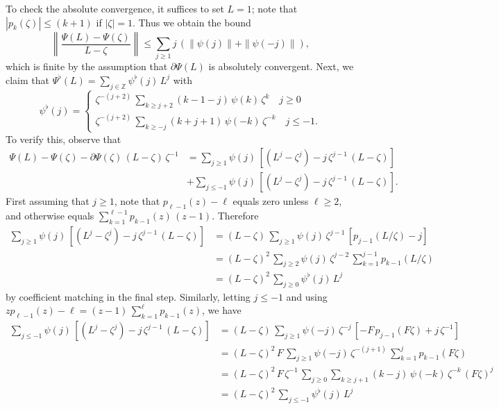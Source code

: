 \documentclass[a4paper]{book}
\def\ZZ{\mathbb Z}
\begin{document}
 To check the absolute convergence, it suffices to set $L = 1$;  
 note that $| p_k  (\zeta) | \leq (k+1)$
 if $|\zeta| = 1$.  Thus  we obtain the bound
\[
 \left\|   \frac{ \Psi (L) - \Psi (\zeta) }{ L - \zeta}  \right\| 
 \leq \sum_{j \geq 1}  j \, \left( \| \psi (j) \|  +\| \psi (-j) \| \right),
\]
 which is finite by the assumption that $\partial \Psi (L)$ 
 is absolutely convergent.   Next, we claim that
$\Psi^{\flat} (L) = \sum_{j \in \ZZ} \psi^{\flat} (j) \, L^j$ with
\[
 \psi^{\flat} (j) = \begin{cases}  {\zeta}^{-(j+2)} \, 
 \sum_{k \geq j+2} (k-1-j) \, \psi (k) \, \zeta^k  \quad j \geq 0 \\
					\zeta^{-(j+2)} \, \sum_{k \geq -j} (k+j+1) \,
					\psi (-k) \,  {\zeta}^{-k} \quad j \leq -1.	
		\end{cases}
\]
To verify this, observe that
\begin{align*}
  \Psi (L) - \Psi (\zeta)  - \partial \Psi (\zeta) \, (L- \zeta) \, \zeta^{-1} 
 & = \sum_{j \geq 1} \psi (j) \, \left[ (L^j - \zeta^j)  
 - j \, \zeta^{j-1}   \, (L- \zeta) \right]  \\
& + \sum_{j \leq -1} \psi (j) \, \left[ (L^j - \zeta^j)  
- j \, \zeta^{j-1}   \, (L- \zeta) \right].
\end{align*}
 First assuming that $j \geq 1$, note that $p_{\ell-1} (z) - \ell$
 equals zero unless $\ell \geq 2$, 
 and otherwise   equals $\sum_{k=1}^{\ell-1} p_{k-1} (z) \, (z -1)$. Therefore 
\begin{align*}
 \sum_{j \geq 1} \psi (j) \, \left[ (L^j - \zeta^j)  
 - j \, \zeta^{j-1}  \, (L- \zeta) \right]    & 
 = (L- \zeta) \, \sum_{j \geq 1} \psi (j) \, 
 \zeta^{j-1} \, \left[   p_{j-1} (L/\zeta) 	  - j   \right]   \\
 & =  {(L - \zeta)}^2 \, \sum_{j \geq 2} \psi (j) \, 
 \zeta^{j-2} \, \sum_{k=1}^{j-1} p_{k-1} (L/\zeta)   \\
 & =  {(L - \zeta)}^2 \, \sum_{j \geq 0} \psi^{\flat} (j) \,  L^j 
\end{align*}
 by coefficient matching in the final step.  Similarly, letting $j \leq -1$ 
 and using $z p_{\ell-1} (z) - \ell = (z-1) \, 
 \sum_{k=1}^{\ell} p_{k-1} (z)$, we have
\begin{align*}
 \sum_{j \leq -1} \psi (j) \, \left[ (L^j - \zeta^j) 
 - j \, \zeta^{j-1}  \, (L- \zeta) \right]    & 
  =  (L- \zeta) \, \sum_{j \geq 1} \psi (-j) \, \zeta^{-j} \,
  \left[ - F \,  p_{j-1} (F \zeta)  +  j  \, \zeta^{-1} \right]   \\
 & =  {(L- \zeta)}^2 \, F \, \sum_{j \geq 1} \psi(-j) \, 
 \zeta^{-(j+1)} \, \sum_{k=1}^{j} p_{k-1} (F \zeta)  \\
 & = {(L- \zeta)}^2 \, F \, \zeta^{-1} \, \sum_{j \geq 0} 
 \sum_{k \geq j+1}  (k-j) \, \psi (-k) \, \zeta^{-k} \, {(F \zeta)}^j \\
 & = {(L-\zeta)}^2 \,  \sum_{j \leq -1}  \psi^{\flat} (j) \, L^j
\end{align*}
\end{document}

